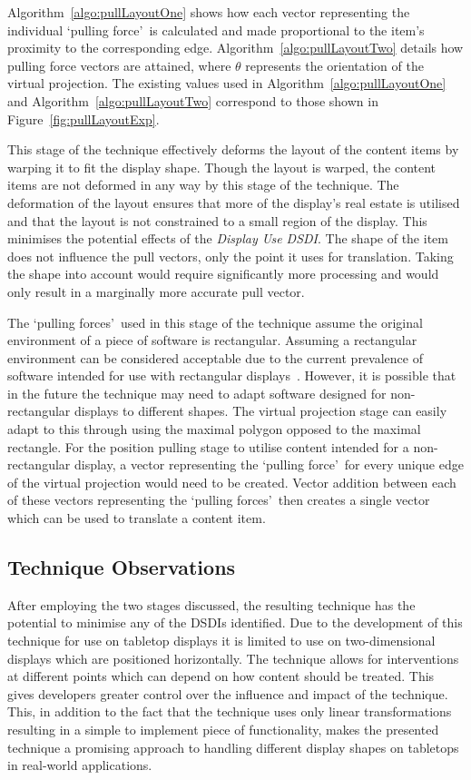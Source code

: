\documentclass[twocolumn,compsoc]{cvm}
\begin{document}
Algorithm~\ref{algo:pullLayoutOne} shows how each vector representing the individual \lq pulling force\rq\ is calculated and made proportional to the item's proximity to the corresponding edge.
Algorithm~\ref{algo:pullLayoutTwo} details how pulling force vectors are attained, where $\theta$ represents the orientation of the virtual projection.
The existing values used in Algorithm~\ref{algo:pullLayoutOne} and Algorithm~\ref{algo:pullLayoutTwo} correspond to those shown in Figure~\ref{fig:pullLayoutExp}.

This stage of the technique effectively deforms the layout of the content items by warping it to fit the display shape.
Though the layout is warped, the content items are not deformed in any way by this stage of the technique.
The deformation of the layout ensures that more of the display's real estate is utilised and that the layout is not constrained to a small region of the display.
This minimises the potential effects of the {\emph{Display Use \ac{DSDI}}}.
The shape of the item does not influence the pull vectors, only the point it uses for translation.
Taking the shape into account would require significantly more processing and would only result in a marginally more accurate pull vector.

The \lq pulling forces\rq\ used in this stage of the technique assume the original environment of a piece of software is rectangular.
Assuming a rectangular environment can be considered acceptable due to the current prevalence of software intended for use with rectangular displays~\cite{VanDam2001}.
However, it is possible that in the future the technique may need to adapt software designed for non-rectangular displays to different shapes.
The virtual projection stage can easily adapt to this through using the maximal polygon opposed to the maximal rectangle.
For the position pulling stage to utilise content intended for a non-rectangular display, a vector representing the \lq pulling force\rq\ for every unique edge of the virtual projection would need to be created.
Vector addition between each of these vectors representing the \lq pulling forces\rq\ then creates a single vector which can be used to translate a content item.

\subsection{Technique Observations}
\label{subsec:techniqueobservations} 

After employing the two stages discussed, the resulting technique has the potential to minimise any of the \acp{DSDI} identified. 
Due to the development of this technique for use on tabletop displays it is limited to use on two-dimensional displays which are positioned horizontally.
The technique allows for interventions at different points which can depend on how content should be treated.
This gives developers greater control over the influence and impact of the technique.
This, in addition to the fact that the technique uses only linear transformations resulting in a simple to implement piece of functionality, makes the presented technique a promising approach to handling different display shapes on tabletops in real-world applications.
\end{document}
